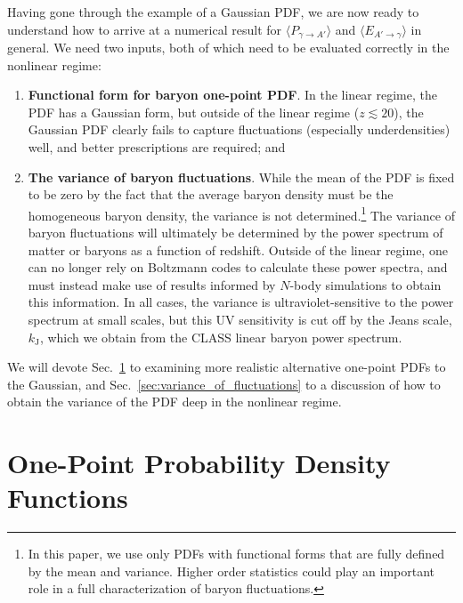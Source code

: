 \documentclass[prd,aps,10pt,nofootinbib,twocolumn,superscriptaddress,preprintnumbers,balancelastpage,longbibliography]{revtex4-1}
\begin{document}
Having gone through the example of a Gaussian PDF, we are now ready to understand how to arrive at a numerical result for $\langle P_{\gamma \to A'} \rangle$ and $\langle E_{A' \to \gamma} \rangle$ in general. We need two inputs, both of which need to be evaluated correctly in the nonlinear regime:
\begin{enumerate}
    \item \textbf{Functional form for baryon one-point PDF}\@. In the linear regime, the PDF has a Gaussian form, but outside of the linear regime ($z \lesssim 20$), the Gaussian PDF clearly fails to capture fluctuations (especially underdensities) well, and better prescriptions are required; and
    \item \textbf{The variance of baryon fluctuations}. While the mean of the PDF is fixed to be zero by the fact that the average baryon density must be the homogeneous baryon density, the variance is not determined.\footnote{In this paper, we use only PDFs with functional forms that are fully defined by the mean and variance. Higher order statistics could play an important role in a full characterization of baryon fluctuations.} 
    The variance of baryon fluctuations will ultimately be determined by the power spectrum of matter or baryons as a function of redshift.
    Outside of the linear regime, one can no longer rely on Boltzmann codes to calculate these power spectra, and must instead make use of results informed by $N$-body simulations to obtain this information. 
    In all cases, the variance is ultraviolet-sensitive to the power spectrum at small scales, but this UV sensitivity is cut off by the Jeans scale, $k_\text{J}$, which we obtain from the CLASS linear baryon power spectrum. 
\end{enumerate}
We will devote Sec.~\ref{sec:PDFs} to examining more realistic alternative one-point PDFs to the Gaussian, and Sec.~\ref{sec:variance_of_fluctuations} to a discussion of how to obtain the variance of the PDF deep in the nonlinear regime. 

\section{One-Point Probability Density Functions}
\label{sec:PDFs}

\renewcommand*{\arraystretch}{1.5}
\end{document}
